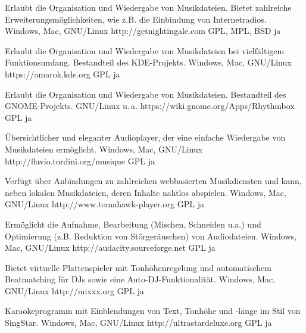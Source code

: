 





{Erlaubt die Organisation und Wiedergabe von Musikdateien. Bietet zahlreiche Erweiterungsmöglichkeiten, wie z.B. die Einbindung von Internetradios.}
{Windows, Mac, GNU/Linux}
{http://getnightingale.com}
{GPL, MPL, BSD}
{ja}

{Erlaubt die Organisation und Wiedergabe von Musikdateien bei vielfältigem Funktionsumfang. Bestandteil des KDE-Projekts.}
{Windows, Mac, GNU/Linux}
{https://amarok.kde.org}
{GPL}
{ja}

{Erlaubt die Organisation und Wiedergabe von Musikdateien. Bestandteil des GNOME-Projekts.}
{GNU/Linux u.\,a.}
{https://wiki.gnome.org/Apps/Rhythmbox}
{GPL}
{ja}

{Übersichtlicher und eleganter Audioplayer, der eine einfache Wiedergabe von Musikdateien ermöglicht.}
{Windows, Mac, GNU/Linux}
{http://flavio.tordini.org/musique}
{GPL}
{ja}

{Verfügt über Anbindungen zu zahlreichen webbasierten Musikdiensten und kann, neben lokalen Musikdateien, deren Inhalte nahtlos abspielen.}
{Windows, Mac, GNU/Linux}
{http://www.tomahawk-player.org}  %
{GPL}
{ja}

{Ermöglicht die Aufnahme, Bearbeitung (Mischen, Schneiden u.a.) und Optimierung (z.B. Reduktion von Störgeräuschen) von Audiodateien.}
{Windows, Mac, GNU/Linux}
{http://audacity.sourceforge.net}
{GPL}
{ja}

{Bietet virtuelle Plattenspieler mit Tonhöhenregelung und automatischem Beatmatching für DJs sowie eine Auto-DJ-Funktionalität.}
{Windows, Mac, GNU/Linux}
{http://mixxx.org}
{GPL}
{ja}

{Karaokeprogramm mit Einblendungen von Text, Tonhöhe und -länge im Stil von SingStar.}
{Windows, Mac, GNU/Linux}
{http://ultrastardeluxe.org}
{GPL}
{ja}


\backpage


